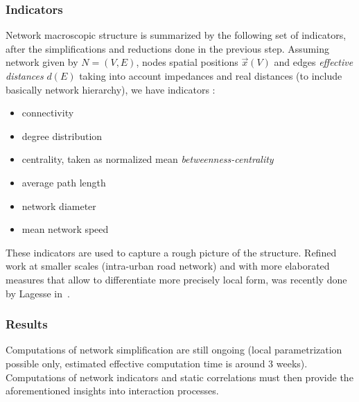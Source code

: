 \subsubsection{Indicators}

Network macroscopic structure is summarized by the following set of indicators, after the simplifications and reductions done in the previous step. Assuming network given by $N=(V,E)$, nodes spatial positions $\vec{x}(V)$ and edges \emph{effective distances} $d(E)$ taking into account impedances and real distances (to include basically network hierarchy), we have indicators :
\begin{itemize}
\item connectivity
\item degree distribution
\item centrality, taken as normalized mean \emph{betweenness-centrality}
\item average path length
\item network diameter
\item mean network speed
\end{itemize}

These indicators are used to capture a rough picture of the structure. Refined work at smaller scales (intra-urban road network) and with more elaborated measures that allow to differentiate more precisely local form, was recently done by Lagesse in~\cite{2015arXiv151201268L}.



\subsubsection{Results}

Computations of network simplification are still ongoing (local parametrization possible only, estimated effective computation time is around 3 weeks). Computations of network indicators and static correlations must then provide the aforementioned insights into interaction processes.










